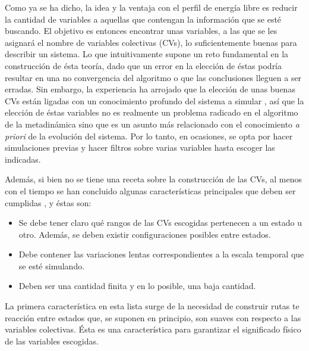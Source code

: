 \documentclass [11pt]{article}
\begin{document}
Como ya se ha dicho, la idea y la ventaja con el perfil de energía libre es reducir la cantidad de variables a aquellas que contengan la información que se esté buscando. El objetivo es entonces encontrar unas variables, a las que se les asignará el nombre de variables colectivas (CVs), lo suficientemente buenas para describir un sistema. Lo que intuitivamente supone un reto fundamental en la construcción de ésta teoría, dado que un error en la elección de éstas podría resultar en una no convergencia del algoritmo o que las conclusiones lleguen a ser erradas. Sin embargo, la experiencia ha arrojado que la elección de unas buenas CVs están ligadas con un conocimiento profundo del sistema a simular \cite{branduardi}, así que la elección de éstas variables no es realmente un problema radicado en el algoritmo de la metadinámica sino que es un asunto más relacionado con el conocimiento {\it a priori} de la evolución del sistema. Por lo tanto, en ocasiones, se opta por hacer simulaciones previas y hacer filtros sobre varias variables hasta escoger las indicadas. 

Además, si bien no se tiene una receta sobre la construcción de las CVs, al menos con el tiempo se han concluido algunas características principales que deben ser cumplidas \cite{barducci}, y éstas son:
\begin{itemize}
    \item Se debe tener claro qué rangos de las CVs escogidas pertenecen a un estado u otro. Además, se deben existir configuraciones posibles entre estados.
    \item Debe contener las variaciones lentas correspondientes a la escala temporal que se esté simulando.
    \item Deben ser una cantidad finita y en lo posible, una baja cantidad.
\end{itemize}

La primera característica en esta lista surge de la necesidad de construir rutas te reacción entre estados que, se suponen en principio, son suaves con respecto a las variables colectivas. Ésta es una característica para garantizar el significado físico de las variables escogidas.
\end{document}

